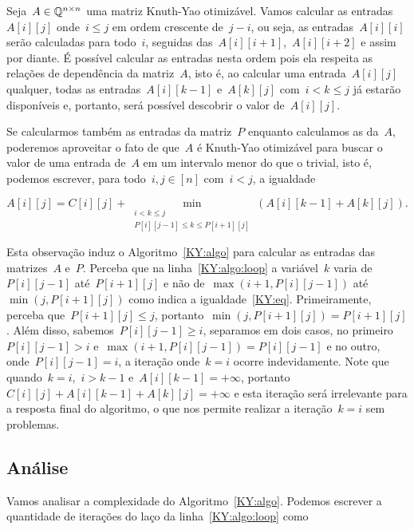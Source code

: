 Seja~$A \in \mathbb{Q}^{n \times n}$ uma matriz Knuth-Yao otimizável. Vamos calcular as entradas~$A[i][j]$ onde~$i \leq j$ em ordem crescente de~$j - i$, ou seja, as entradas~$A[i][i]$ serão calculadas para todo~$i$, seguidas das~$A[i][i+1]$,~$A[i][i+2]$ e assim por diante. É possível calcular as entradas nesta ordem pois ela respeita as relações de dependência da matriz~$A$, isto é, ao calcular uma entrada~$A[i][j]$ qualquer, todas as entradas~$A[i][k-1]$ e~$A[k][j]$ com~$i < k \leq j$ já estarão disponíveis e, portanto, será possível descobrir o valor de~$A[i][j]$.

Se calcularmos também as entradas da matriz~$P$ enquanto calculamos as da~$A$, poderemos aproveitar o fato de que~$A$ é Knuth-Yao otimizável para buscar o valor de uma entrada de~$A$ em um intervalo menor do que o trivial, isto é, podemos escrever, para todo~$i,j \in [n]$ com~$i < j$, a igualdade

\begin{equation} \label{KY:eq}
{A[i][j] = C[i][j] + \min\limits_{\substack{i < k \leq j \\ P[i][j-1] \leq k \leq P[i+1][j]}} (A[i][k-1] + A[k][j])} \text{.}
\end{equation}

Esta observação induz o Algoritmo~\ref{KY:algo} para calcular as entradas das matrizes~$A$ e~$P$. Perceba que na linha~\ref{KY:algo:loop} a variável~$k$ varia de~$P[i][j-1]$ até~$P[i+1][j]$ e não de~$\max(i+1,P[i][j-1])$ até~$\min(j,P[i+1][j])$ como indica a igualdade~\eqref{KY:eq}. Primeiramente, perceba que~$P[i+1][j] \leq j$, portanto~$\min(j,P[i+1][j]) = P[i+1][j]$. Além disso, sabemos~$P[i][j-1] \geq i$, separamos em dois casos, no primeiro~$P[i][j-1] > i$ e~$\max(i+1,P[i][j-1]) = P[i][j-1]$ e no outro, onde~$P[i][j-1] = i$, a iteração onde~$k=i$ ocorre indevidamente. Note que quando~$k = i$,~$i > k-1$ e~$A[i][k-1] = +\infty$, portanto~$C[i][j] + A[i][k-1] + A[k][j] = +\infty$ e esta iteração será irrelevante para a resposta final do algoritmo, o que nos permite realizar a iteração~$k=i$ sem problemas.


\subsection{Análise}

Vamos analisar a complexidade do Algoritmo~\ref{KY:algo}. Podemos escrever a quantidade de iterações do laço da linha~\ref{KY:algo:loop} como

